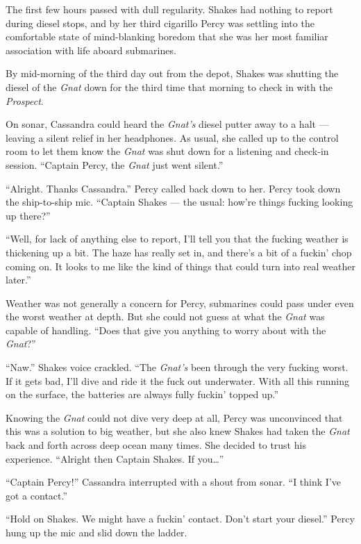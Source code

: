 \documentclass[]{scrbook}
\begin{document}
The first few hours passed with dull regularity. Shakes had nothing to
report during diesel stops, and by her third cigarillo Percy was
settling into the comfortable state of mind-blanking boredom that she
was her most familiar association with life aboard submarines.

By mid-morning of the third day out from the depot, Shakes was shutting
the diesel of the \emph{Gnat} down for the third time that morning to
check in with the \emph{Prospect}.

On sonar, Cassandra could heard the \emph{Gnat's} diesel putter away to
a halt --- leaving a silent relief in her headphones. As usual, she
called up to the control room to let them know the \emph{Gnat} was shut
down for a listening and check-in session. ``Captain Percy, the
\emph{Gnat} just went silent.''

``Alright. Thanks Cassandra.'' Percy called back down to her. Percy took
down the ship-to-ship mic. ``Captain Shakes --- the usual: how're things
fucking looking up there?''

``Well, for lack of anything else to report, I'll tell you that the
fucking weather is thickening up a bit. The haze has really set in, and
there's a bit of a fuckin' chop coming on. It looks to me like the kind
of things that could turn into real weather later.''

Weather was not generally a concern for Percy, submarines could pass
under even the worst weather at depth. But she could not guess at what
the \emph{Gnat} was capable of handling. ``Does that give you anything
to worry about with the \emph{Gnat}?''

``Naw.'' Shakes voice crackled. ``The \emph{Gnat's} been through the
very fucking worst. If it gets bad, I'll dive and ride it the fuck out
underwater. With all this running on the surface, the batteries are
always fully fuckin' topped up.''

Knowing the \emph{Gnat} could not dive very deep at all, Percy was
unconvinced that this was a solution to big weather, but she also knew
Shakes had taken the \emph{Gnat} back and forth across deep ocean many
times. She decided to trust his experience. ``Alright then Captain
Shakes. If you\ldots{}''

``Captain Percy!'' Cassandra interrupted with a shout from sonar. ``I
think I've got a contact.''

``Hold on Shakes. We might have a fuckin' contact. Don't start your
diesel.'' Percy hung up the mic and slid down the ladder.
\end{document}
